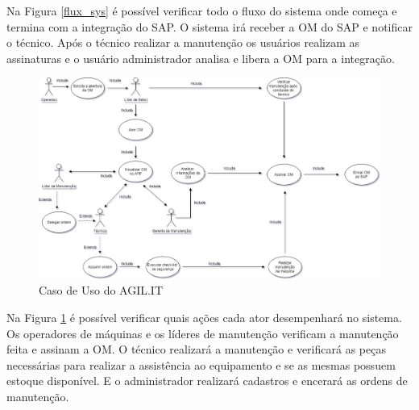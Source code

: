 Na Figura \ref{flux_sys} é possível verificar todo o fluxo do sistema onde começa e termina com a integração do SAP.
O sistema irá receber a OM do SAP e notificar o técnico. Após o técnico realizar a manutenção os usuários realizam as assinaturas e o usuário administrador analisa e libera a OM para a integração.

\newpage
\begin{figure}[htb]
	\caption{\label{caso_uso}Caso de Uso do AGIL.IT}
	\begin{center}
		\includegraphics[scale=0.50]{./Figuras/caso-uso.png}
	\end{center}
\end{figure}

Na Figura \ref{caso_uso} é possível verificar quais ações cada ator desempenhará no sistema.
Os operadores de máquinas e os líderes de manutenção verificam a manutenção feita e assinam a OM. O técnico realizará a manutenção e verificará as peças necessárias para realizar a assistência ao equipamento e se as mesmas possuem estoque disponível. E o administrador realizará cadastros e encerará as ordens de manutenção.

